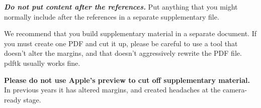 \documentclass{article}
\begin{document}
\textbf{\emph{Do not put content after the references.}}
%
Put anything that you might normally include after the references in a separate
supplementary file.

We recommend that you build supplementary material in a separate document.
If you must create one PDF and cut it up, please be careful to use a tool that
doesn't alter the margins, and that doesn't aggressively rewrite the PDF file.
pdftk usually works fine.

\textbf{Please do not use Apple's preview to cut off supplementary material.} In
previous years it has altered margins, and created headaches at the camera-ready
stage.
\end{document}
